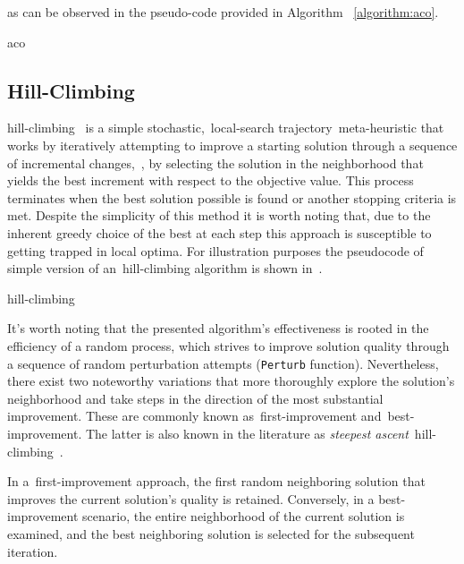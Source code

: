 as can be observed in the pseudo-code
provided in Algorithm ~\ref{algorithm:aco}.

\begin{algorithm}
  
  \caption{\acrlong{aco}}
  \label{algorithm:aco}
\end{algorithm}

\subsection{Hill-Climbing}
\label{subsec:hill-climbing}

\acrfull{hill-climbing}~\cite{luke2013essentialsa,vieira2009uma} is a simple
stochastic,~\acrshort{local-search} trajectory~\acrshort{meta-heuristic} that
works by iteratively attempting to improve a starting solution through a
sequence of incremental changes,~\ie{}, by selecting the solution in the
neighborhood that yields the best increment with respect to the objective value.
This process terminates when the best solution possible is found or another
stopping criteria is met. Despite the simplicity of this method it is worth
noting that, due to the inherent greedy choice of the best at each step this
approach is susceptible to getting trapped in local optima. For illustration
purposes the pseudocode of simple version of an~\acrshort{hill-climbing}
algorithm is shown in~.

\begin{algorithm}
  
  \caption{\acrlong{hill-climbing}}
  \label{algorithm:hill-climbing}
\end{algorithm}

It's worth noting that the presented algorithm's effectiveness is rooted in the
efficiency of a random process, which strives to improve solution quality
through a sequence of random perturbation attempts (\texttt{Perturb} function).
Nevertheless, there exist two noteworthy variations that more thoroughly explore
the solution's neighborhood and take steps in the direction of the most
substantial improvement. These are commonly known as~\acrfull{first-improvement}
and~\acrfull{best-improvement}. The latter is also known in the literature as
\textit{steepest ascent}~\acrshort{hill-climbing}~\cite{luke2013essentialsa}.

In a~\acrshort{first-improvement} approach, the first random neighboring solution that
improves the current solution's quality is retained. Conversely, in a
\acrshort{best-improvement} scenario, the entire neighborhood of the current
solution is examined, and the best neighboring solution is selected for the
subsequent iteration.

